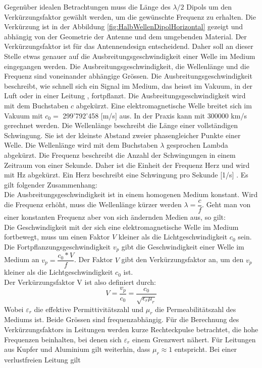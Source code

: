 \newpage
Gegenüber idealen Betrachtungen muss die Länge des $\lambda /2$ Dipols um den Verkürzungsfaktor gewählt werden, um  die gewünschte Frequenz zu erhalten. Die Verkürzung  ist in der Abbildung \ref{fig:HalbWellenDipolHorizontal} gezeigt und abhängig von der Geometrie der Antenne und dem umgebenden Material\cite{Hcuno}.
Der Verkürzungsfaktor ist für das Antennendesign entscheidend. Daher soll an dieser Stelle etwas genauer auf die Ausbreitungsgeschwindigkeit einer Welle im Medium eingegangen werden.
Die Ausbreitungsgeschwindigkeit, die Wellenlänge und die Frequenz sind voneinander abhängige Grössen. 
Die Ausbreitungsgeschwindigkeit beschreibt, wie schnell sich ein Signal im Medium, das heisst im Vakuum, in der Luft oder in einer Leitung , fortpflanzt. Die Ausbreitungsgeschwindigkeit wird mit dem Buchstaben $c$ abgekürzt. Eine elektromagnetische Welle breitet sich im
Vakuum mit $c_0 = $ 299'792’458 [m/s] aus. In der Praxis kann mit 300000 km/s gerechnet werden.
Die Wellenlänge beschreibt die Länge einer vollständigen Schwingung. Sie ist der kleinste Abstand zweier phasengleicher Punkte einer Welle. Die Wellenlänge wird mit dem Buchstaben $\lambda$ gesprochen Lambda abgekürzt. Die Frequenz beschreibt  die Anzahl der Schwingungen in einem  Zeitraum von einer Sekunde. Daher ist die Einheit der Frequenz Herz und wird mit Hz abgekürzt. Ein Herz  beschreibt eine Schwingung pro Sekunde [1/s] \cite{Verkuertzungsfaktor}.
Es gilt folgender Zusammenhang:\\
Die Ausbreitungsgeschwindigkeit ist in einem homogenen Medium konstant. Wird die Frequenz erhöht, muss  die Wellenlänge kürzer werden $\lambda = \dfrac{c}{f}$. Geht man von einer konstanten Frequenz aber von sich ändernden Medien aus, so gilt: \\
Die Geschwindigkeit mit der sich eine elektromagnetische Welle im Medium fortbewegt, muss um einen Faktor $V$ kleiner  als die Lichtgeschwindigkeit $c_0$ sein.\\
Die Fortpflanzungsgeschwindigkeit $v_p$ gibt die Geschwindigkeit einer Welle im Medium an  $v_p=\dfrac{c_0*V}{f} $. Der Faktor $V$ gibt den Verkürzungsfaktor an, um den $v_p$ kleiner als die Lichtgeschwindigkeit $c_0$ ist. \\
Der Verkürzungsfaktor V ist also definiert durch:
\begin{equation}
V=\dfrac{v_p}{c_0}=\dfrac{c_0}{\sqrt{\epsilon_r \mu_r}}
\end{equation}
Wobei $\varepsilon_r$ die effektive Permittivitätszahl
 und $\mu_r$ die Permeabilitätszahl des Mediums ist. Beide Grössen sind  frequenzabhängig. Für die Berechnung des Verkürzungsfaktors in Leitungen werden kurze Rechteckpulse betrachtet, die hohe Frequenzen beinhalten, bei denen sich $\varepsilon_r$ einem Grenzwert nähert. Für Leitungen aus Kupfer und Aluminium gilt weiterhin, dass $\mu_r \approx 1$ entspricht. Bei einer verlustfreien Leitung gilt\cite{Verkuertzungsfaktor_wiki}
